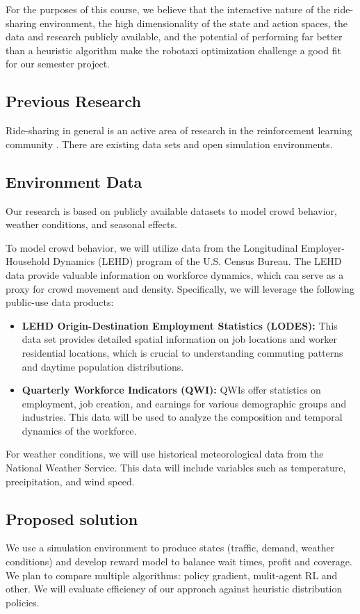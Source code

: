 \documentclass[12pt]{article}
\begin{document}
For the purposes of this course, we believe that the interactive nature of the
ride-sharing environment,
the high dimensionality of the state and action spaces, the data and research publicly
available, and the potential of performing far better than a heuristic algorithm make the
robotaxi optimization challenge a good fit for our semester project.

\subsection*{Previous Research}
Ride-sharing in general is an active area of research in the reinforcement learning
community \cite{ridesharing_survey}. There are existing data sets and open simulation environments.

\subsection*{Environment Data}

Our research is based on publicly available datasets to model crowd behavior, weather
conditions, and seasonal effects.

To model crowd behavior, we will utilize data from the Longitudinal Employer-Household
Dynamics (LEHD) program of the U.S. Census Bureau. The LEHD data provide valuable
information on workforce dynamics, which can serve as a proxy for crowd movement and
density. Specifically, we will leverage the following public-use data products:
\begin{itemize}
		\item \textbf{LEHD Origin-Destination Employment Statistics (LODES):} This data set
				provides detailed spatial information on job locations and worker residential
				locations, which is crucial to understanding commuting patterns and daytime
				population distributions.
		\item \textbf{Quarterly Workforce Indicators (QWI):} QWIs offer statistics on
				employment, job creation, and earnings for various demographic groups and industries.
				This data will be used to analyze the composition and temporal dynamics of the workforce.
\end{itemize}

For weather conditions, we will use historical meteorological data from the National
Weather Service. This data will include variables such as temperature, precipitation, and
wind speed.

\subsection*{Proposed solution}
We use a simulation environment to produce states (traffic, demand, weather conditions)
and develop reward model to balance wait times, profit and coverage. We plan to compare
multiple algorithms: policy gradient, mulit-agent RL and other. We will evaluate
efficiency of our approach against heuristic distribution policies.
\end{document}

